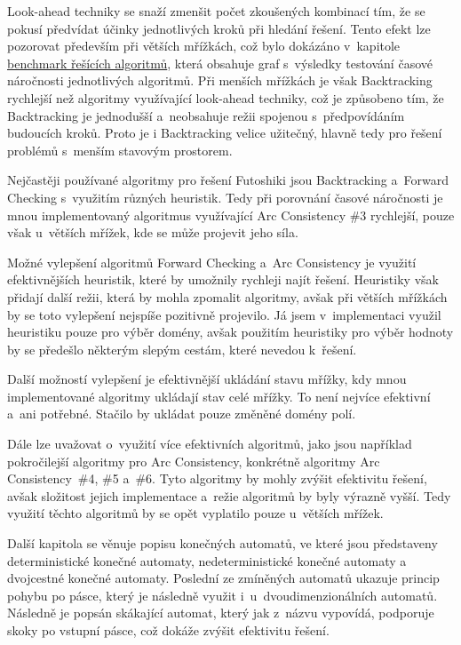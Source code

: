 Look-ahead techniky se snaží zmenšit počet zkoušených kombinací tím, že se
pokusí předvídat účinky jednotlivých kroků při hledání řešení. Tento efekt lze
pozorovat především při větších mřížkách, což bylo dokázáno v~kapitole
\hyperref[sec:timeComplexity]{benchmark řešících algoritmů}, která obsahuje
graf s~výsledky testování časové náročnosti jednotlivých algoritmů. Při menších
mřížkách je však Backtracking rychlejší než algoritmy využívající look-ahead
techniky, což je způsobeno tím, že Backtracking je jednodušší a~neobsahuje
režii spojenou s~předpovídáním budoucích kroků. Proto je i Backtracking velice
užitečný, hlavně tedy pro řešení problémů s~menším stavovým prostorem.

Nejčastěji používané algoritmy pro řešení Futoshiki jsou Backtracking a~Forward
Checking s~využitím různých heuristik. Tedy při porovnání časové náročnosti
je mnou implementovaný algoritmus využívající Arc Consistency \#3 rychlejší,
pouze však u~větších mřížek, kde se může projevit jeho síla.

Možné vylepšení algoritmů Forward Checking a~Arc Consistency je využití
efektivnějších heuristik, které by umožnily rychleji najít řešení. Heuristiky
však přidají další režii, která by mohla zpomalit algoritmy, avšak při větších
mřížkách by se toto vylepšení nejspíše pozitivně projevilo. Já jsem
v~implementaci využil heuristiku pouze pro výběr domény, avšak použitím
heuristiky pro výběr hodnoty by se předešlo některým slepým cestám, které
nevedou k~řešení.

Další možností vylepšení je efektivnější ukládání stavu mřížky, kdy mnou
implementované algoritmy ukládají stav celé mřížky. To není nejvíce efektivní
a~ani potřebné. Stačilo by ukládat pouze změněné domény polí.

Dále lze uvažovat o~využití více efektivních algoritmů, jako jsou například
pokročilejší algoritmy pro Arc Consistency, konkrétně algoritmy
Arc Consistency~\#4, \#5 a~\#6. Tyto algoritmy by mohly zvýšit efektivitu
řešení, avšak složitost jejich implementace a~režie algoritmů by byly výrazně
vyšší. Tedy využití těchto algoritmů by se opět vyplatilo pouze u~větších
mřížek.

Další kapitola se věnuje popisu konečných automatů, ve které jsou představeny
deterministické konečné automaty, nedeterministické konečné automaty a
dvojcestné konečné automaty. Poslední ze zmíněných automatů ukazuje princip
pohybu po pásce, který je následně využit i~u~dvoudimenzionálních automatů.
Následně je popsán skákající automat, který jak z~názvu vypovídá, podporuje
skoky po vstupní pásce, což dokáže zvýšit efektivitu řešení.

